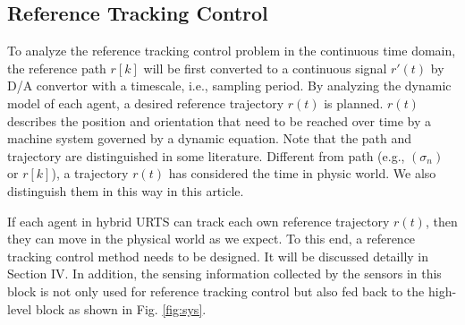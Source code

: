 \documentclass{ieeeaccess}
\begin{document}
\subsection{Reference Tracking Control}
To analyze the reference tracking control problem in the continuous time domain, the reference path $r[k]$ will be first converted to a continuous signal $r'(t)$ by D/A convertor with a timescale, i.e., sampling period. By analyzing the dynamic model of each agent, a desired reference trajectory $r(t)$ is planned. $r(t)$ describes the position and orientation that need to be reached over time by a machine system governed by a dynamic equation. Note that the path and trajectory are distinguished in some literature. Different from path (e.g., $(\sigma_n)$ or $r[k]$), a trajectory $r(t)$ has considered the time in physic world. We also distinguish them in this way in this article.

If each agent in hybrid URTS can track each own reference trajectory $r(t)$, then they can move in the physical world as we expect. To this end, a reference tracking control method needs to be designed. It will be discussed detailly in Section IV. In addition, the sensing information collected by the sensors in this block is not only used for reference tracking control but also fed back to the high-level block as shown in Fig. \ref{fig:sys}.
\end{document}
